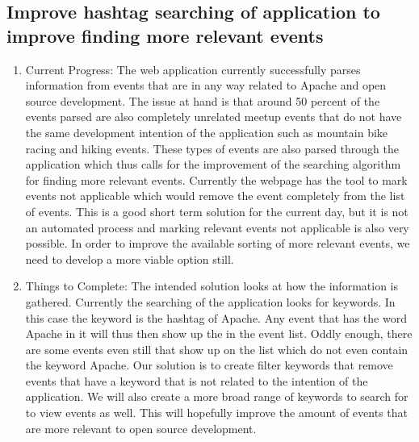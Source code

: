 \documentclass[letterpaper,10pt,onecolumn]{IEEEtran} %
\begin{document}
\subsection{Improve hashtag searching of application to improve finding more relevant events}
\begin{enumerate}[label*=\arabic*.]
  \item Current Progress: The web application currently successfully parses
    information from events that are in any way related to Apache and open source
    development. The issue at hand is that around 50 percent of the events parsed
    are also completely unrelated meetup events that do not have the same
    development intention of the application such as mountain bike racing and
    hiking events. These types of events are also parsed through the application
    which thus calls for the improvement of the searching algorithm for finding
    more relevant events. Currently the webpage has the tool to mark events not
    applicable which would remove the event completely from the list of events.
    This is a good short term solution for the current day, but it is not an
    automated process and marking relevant events not applicable is also very
    possible. In order to improve the available sorting of more relevant events,
    we need to develop a more viable option still.

  \item Things to Complete: The intended solution looks at how the information is
    gathered. Currently the searching of the application looks for keywords. In
    this case the keyword is the hashtag of Apache. Any event that has the word
    Apache in it will thus then show up the in the event list. Oddly enough, there
    are some events even still that show up on the list which do not even contain
    the keyword Apache. Our solution is to create filter keywords that remove
    events that have a keyword that is not related to the intention of the
    application. We will also create a more broad range of keywords to search for
    to view events as well. This will hopefully improve the amount of events that
    are more relevant to open source development.
\end{enumerate}
\end{document}
